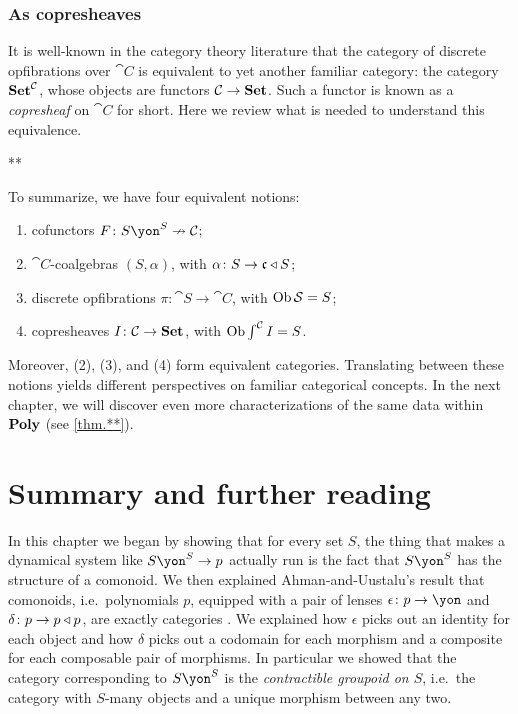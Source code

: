 \documentclass[Book-Poly]{subfiles}
\begin{document}
\subsubsection{As copresheaves}

It is well-known in the category theory literature that the category of discrete opfibrations over $\cat{C}$ is equivalent to yet another familiar category: the category $\mathbf{Set}^{\mathcal{C}}$, whose objects are functors $\mathcal{C}\to\mathbf{Set}$.
Such a functor is known as a \emph{copresheaf} on $\cat{C}$ for short.
Here we review what is needed to understand this equivalence.

**

To summarize, we have four equivalent notions:
\begin{enumerate}[label=(\arabic*)]
    \item cofunctors $F\colon S\yon^S\cof\cat{C}$;
    \item $\cat{C}$-coalgebras $(S,\alpha)$, with $\alpha\colon S\to\mathfrak{c}\mathbin{\triangleleft} S$;
    \item discrete opfibrations $\pi\colon \cat{S}\to\cat{C}$, with $\operatorname{Ob}\mathcal{S}=S$;
    \item copresheaves $I\colon\mathcal{C}\to\mathbf{Set}$, with $\operatorname{Ob}\int^{\mathcal{C}}I=S$.
\end{enumerate}
Moreover, (2), (3), and (4) form equivalent categories.
Translating between these notions yields different perspectives on familiar categorical concepts.
In the next chapter, we will discover even more characterizations of the same data within $\mathbf{Poly}$ (see \cref{thm.**}).

\section{Summary and further reading}

In this chapter we began by showing that for every set $S$, the thing that makes a dynamical system like $S\yon^S\to p$ actually run is the fact that $S\yon^S$ has the structure of a comonoid.  We then explained Ahman-and-Uustalu's result that comonoids, i.e.\ polynomials $p$, equipped with a pair of lenses $\epsilon\colon p\to\yon$ and $\delta\colon p\to p\mathbin{\triangleleft} p$, are exactly categories \cite{ahman2016directed}. We explained how $\epsilon$ picks out an identity for each object and how $\delta$ picks out a codomain for each morphism and a composite for each composable pair of morphisms. In particular we showed that the category corresponding to $S\yon^S$ is the \emph{contractible groupoid on $S$}, i.e.\ the category with $S$-many objects and a unique morphism between any two.
\end{document}
